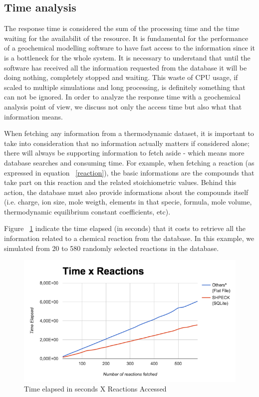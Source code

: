\subsection{Time analysis}
The response time is considered the sum of the processing time and the time waiting for the availabilit of the resource. It is fundamental for the performance of a geochemical modelling software to have fast access to the information since it is a bottleneck for the whole system. 
It is necessary to understand that until the software has received all the information requested from the database it will be doing nothing, completely stopped and waiting. This waste of CPU usage, if scaled to multiple simulations and long processing, is definitely something that can not be ignored. 
In order to analyze the response time with a geochemical analysis point of view, we discuss not only the access time but also what that information means.

When fetching any information from a thermodynamic dataset, it is important to take into consideration that no information actually matters if considered alone; there will always be supporting information to fetch aside - which means more database searches and consuming time. For example, when fetching a reaction (as expressed in equation ~\ref{reaction}), the basic informations are the compounds that take part on this reaction and the related stoichiometric values. Behind this action, the database must also provide informations about the compounds itself (i.e. charge, ion size, mole weigth, elements in that specie, formula, mole volume, thermodynamic equilibrium constant coefficients, etc). 

Figure ~\ref{fig:timeXaccess} indicate the time elapsed (in seconds) that it costs to retrieve all the information related to a chemical reaction from the database. In this example, we simulated from 20 to 580 randomly selected reactions in the database.

\begin{figure}[ht!]
\centering
\includegraphics[width=140mm]{figures/timeXreactionAccess.png}
\caption{Time elapsed in seconds X Reactions Accessed}
\label{fig:timeXaccess}
\end{figure}

